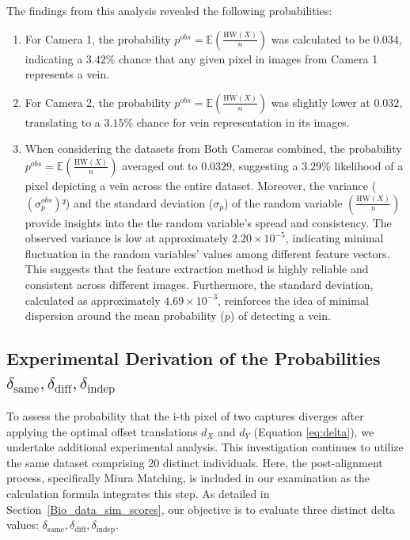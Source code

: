 The findings from this analysis revealed the following probabilities:
\begin{enumerate}
    \item For Camera 1, the probability \(p^{obs} = \mathbb{E}\left( \frac{\text{HW}(X)}{n} \right)\) was calculated to be \(0.034\), indicating a \(3.42\)\% chance that any given pixel in images from Camera 1 represents a vein.

    \item For Camera 2, the probability \(p^{obs} = \mathbb{E}\left( \frac{\text{HW}(X)}{n} \right)\) was slightly lower at \(0.032\), translating to a \(3.15\)\% chance for vein representation in its images.

    \item When considering the datasets from Both Cameras combined, the probability \(p^{obs} = \mathbb{E}\left( \frac{\text{HW}(X)}{n} \right)\) averaged out to \(0.0329\), suggesting a \(3.29\)\% likelihood of a pixel depicting a vein across the entire dataset. Moreover, the variance (\( (\sigma^{obs}_p)² \)) and the standard deviation (\( \sigma_p \)) of the random variable \(\left( \frac{\text{HW}(X)}{n} \right)\) provide insights into the the random variable's spread and consistency. The observed variance is low at approximately \( 2.20 \times 10^{-5} \), indicating minimal fluctuation in the random variables' values among different feature vectors. This suggests that the feature extraction method is highly reliable and consistent across different images. Furthermore, the standard deviation, calculated as approximately \( 4.69 \times 10^{-3} \), reinforces the idea of minimal dispersion around the mean probability (\(p\)) of detecting a vein. 
    
\end{enumerate}

\newpage
\subsection{Experimental Derivation of the Probabilities \(\delta_{\text{same}}, \delta_{\text{diff}}, \delta_{\text{indep}}\)}
\label{sec:delta}

To assess the probability that the i-th pixel of two captures diverges after applying the optimal offset translations \( d_X \) and \( d_Y \) (Equation \ref{eq:delta}), we undertake additional experimental analysis. This investigation continues to utilize the same dataset comprising 20 distinct individuals. Here, the post-alignment process, specifically Miura Matching, is included in our examination as the calculation formula integrates this step. As detailed in Section~\ref{Bio_data_sim_scores}, our objective is to evaluate three distinct delta values: \(\delta_{\text{same}}, \delta_{\text{diff}}, \delta_{\text{indep}}\).

